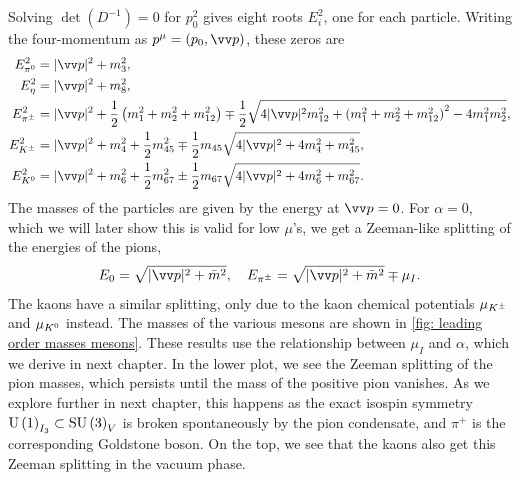 %
Solving $\det(D^{-1}) = 0$ for $p_0^2$ gives eight roots $E_i^2$, one for each particle.
Writing the four-momentum as $p^\mu = (p_0, \vv p)$, these zeros are
%
\begingroup
\allowdisplaybreaks
\begin{align}
    \label{E1}
    E_{\pi^0}^2 &= |\vv p |^2 + m_3^2, \\
    \label{E2}
    E_\eta^2 &= |\vv p |^2 + m_8^2, \\
    E_\pipm^2
    & = |\vv p|^2 +
    \frac{1}{2}
    \left(
        m_1^2 + m_2^2 + m_{12}^2 
    \right)
    \mp
    \frac{1}{2}
    \sqrt{
        4|\vv p|^2m_{12}^2 
        +
        \left(
            m_1^2 + m_2^2 + m_{12}^2
        \right)^2
        - 4 m_1^2 m_2^2
    }, \\
    \label{E3}
    E_\Kpm^2
    & = |\vv p|^2 + m_4^2 + \frac{1}{2} m_{45}^2 
    \mp
    \frac{1}{2} m_{45} \sqrt{4|\vv p|^2 + 4 m_4^2 + m_{45}^2},\\
    \label{E4}
    E_\Ko^2
    &= |\vv p|^2 + m_6^2 + \frac{1}{2} m_{67}^2 
    \pm
    \frac{1}{2} m_{67} \sqrt{4|\vv p|^2 + 4 m_6^2 + m_{67}^2}.
\end{align}
\endgroup
%
The masses of the particles are given by the energy at $\vv p = 0$.
For $\alpha = 0$, which we will later show this is valid for low $\mu$'s, we get a Zeeman-like splitting of the energies of the pions,
%
\begin{equation}
    E_0 =\sqrt{|\vv p|^2 + \bar m^2}, \quad
    E_\pipm = \sqrt{|\vv p|^2 + \bar m^2} \mp \mu_I.
\end{equation}
%
The kaons have a similar splitting, only due to the kaon chemical potentials $\mu_{K^\pm}$ and $\mu_{K^0}$ instead.
The masses of the various mesons are shown in \autoref{fig: leading order masses mesons}.
These results use the relationship between $\mu_I$ and $\alpha$, which we derive in next chapter.
In the lower plot, we see the Zeeman splitting of the pion masses, which persists until the mass of the positive pion vanishes.
As we explore further in next chapter, this happens as the exact isospin symmetry $\text{U}\left(1\right)_{I_3} \subset \text{SU}\left(3\right)_V $ is broken spontaneously by the pion condensate, and $\pi^+$ is the corresponding Goldstone boson.
On the top, we see that the kaons also get this Zeeman splitting in the vacuum phase.
%
